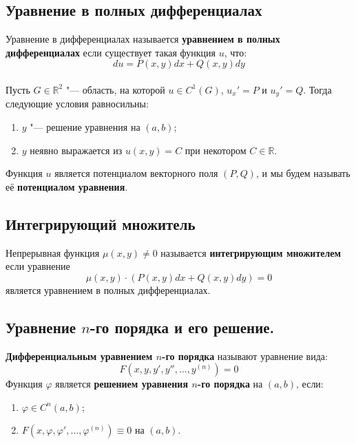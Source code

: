 \documentclass{article}
\begin{document}
\subsection{Уравнение в полных дифференциалах}
Уравнение в дифференциалах называется \textbf{уравнением в полных дифференциалах} если существует такая функция $u$, что:
\begin{equation*}
    du = P(x, y)dx + Q(x, y)dy
\end{equation*}
\\
Пусть $G \in \mathbb{R}^2$ "--- область, на которой $u \in C^1(G)$, $u_x' = P$ и $u_y' = Q$. Тогда следующие условия равносильны:
\begin{enumerate}
    \item $y$ "--- решение уравнения на $(a, b)$;
    \item $y$ неявно выражается из $u(x, y) = C$ при некотором $C \in \mathbb{R}$.
\end{enumerate}
Функция $u$ является потенциалом векторного поля $(P, Q)$, и мы будем называть её \textbf{потенциалом уравнения}.

\subsection{Интегрирующий множитель}
Непрерывная функция $\mu(x, y) \neq 0$ называется \textbf{интегрирующим множителем} если уравнение
\begin{equation*}
    \mu(x, y) \cdot (P(x, y)dx + Q(x, y)dy) = 0   
\end{equation*}
является уравнением в полных дифференциалах.

\subsection{Уравнение $n$-го порядка и его решение.}
\textbf{Дифференциальным уравнением $n$-го порядка} называют уравнение вида:
\begin{equation*}
    F(x, y, y', y'', \ldots, y^{(n)}) = 0
\end{equation*}
Функция $\varphi$ является \textbf{решением уравнения $n$-го порядка} на $(a, b)$, если:
\begin{enumerate}
    \item $\varphi \in C^n(a, b)$;
    \item $F(x, \varphi, \varphi', \ldots, \varphi^{(n)}) \equiv 0$ на $(a, b)$.
\end{enumerate}
\end{document}
